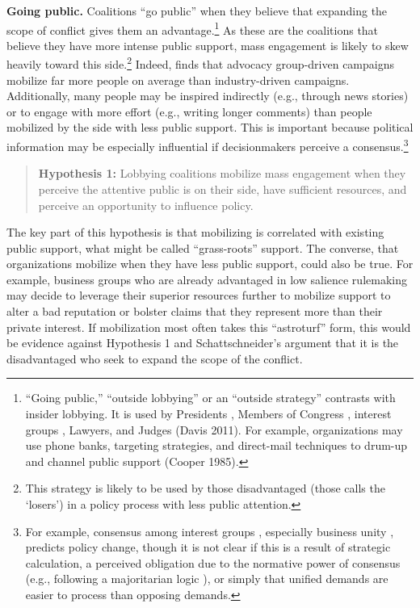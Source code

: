 \documentclass[
      12pt,
        ]{article}
\begin{document}
\textbf{Going public.} Coalitions ``go public'' when they believe that
expanding the scope of conflict gives them an advantage.\footnote{``Going public,'' ``outside lobbying'' or an ``outside strategy''
  contrasts with insider lobbying. It is used by Presidents
  \citep{Kernell2007}, Members of Congress \citep{Malecha2012}, interest groups
  \citep{Walker1991, Dur2013}, Lawyers, and Judges (Davis 2011). For
  example, organizations may use phone banks, targeting strategies,
  and direct-mail techniques to drum-up and channel public support
  (Cooper 1985).} As these
are the coalitions that believe they have more intense public
support, mass engagement is likely to skew heavily toward this side.\footnote{This strategy is likely to be used by those disadvantaged (those
  \citet{Schattschneider1975} calls the `losers') in a policy process with
  less public attention.}
Indeed, \citet{Potter2017} finds that advocacy group-driven campaigns mobilize
far more people on average than industry-driven campaigns. Additionally,
many people may be inspired indirectly (e.g., through news stories) or
to engage with more effort (e.g., writing longer comments) than people
mobilized by the side with less public support. This is important
because political information may be especially influential if
decisionmakers perceive a consensus.\footnote{For example, consensus among interest groups
  \citep{Golden1998, Yackee2006JPART}, especially business unity
  \citep{Yackee2006JOP, Haeder2015}, predicts policy change, though it is
  not clear if this is a result of strategic calculation, a perceived
  obligation due to the normative power of consensus (e.g., following
  a majoritarian logic \citep{Mendelson2011}), or simply that unified
  demands are easier to process than opposing demands.}



\begin{quote}
\textbf{Hypothesis 1:} Lobbying coalitions
mobilize mass engagement when they perceive the attentive public is on
their side, have sufficient resources, and perceive an opportunity to
influence policy.
\end{quote}

The key part of this hypothesis is that mobilizing is correlated with
existing public support, what might be called ``grass-roots'' support. The
converse, that organizations mobilize when they have less public
support, could also be true. For example, business groups who are
already advantaged in low salience rulemaking may decide to leverage
their superior resources further to mobilize support to alter a bad
reputation or bolster claims that they represent more than their private
interest. If mobilization most often takes this ``astroturf'' form, this
would be evidence against
Hypothesis 1 and Schattschneider's argument that it is the
disadvantaged who seek to expand the scope of the conflict.
\end{document}
